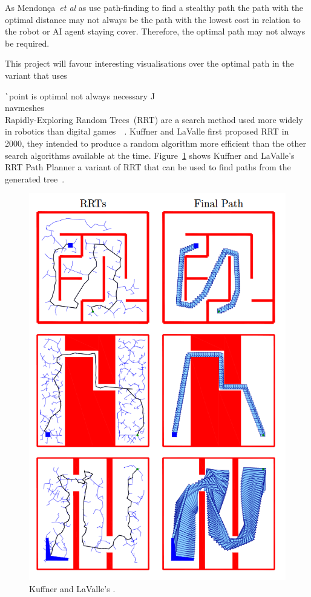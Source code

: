\documentclass[journal]{IEEEtran}
\begin{document}
As Mendonça~\textit{et al} as use path-finding to find a stealthy path the path with the optimal distance may not always be the path with the lowest cost in relation to the robot or AI agent staying cover. Therefore, the optimal path may not always be required. 

This project will favour interesting visualisations over the optimal path in the variant that uses   

^^ point is optimal not always necessary ^^
\\

navmeshes \cite{Hale2008} \cite{Mendonça2015}\\
Rapidly-Exploring Random Trees~(RRT) are a search method used more widely in robotics than digital games~\cite{LaValle1998}~\cite{Kuffner2000}. Kuffner and LaValle first proposed RRT in 2000, they intended to produce a random algorithm more efficient than the other search algorithms available at the time. Figure~\ref{KuffnerRRT} shows  Kuffner and LaValle's RRT Path Planner a variant of RRT that can be used to find paths from the generated tree~\cite{Kuffner2000}.

\begin{figure}[h]
	\includegraphics[width=1.0\linewidth]{KuffnerRRT.png}
	\caption{ Kuffner and LaValle's \cite{Kuffner2000}.}
	\label{KuffnerRRT}
\end{figure} 
\end{document}
